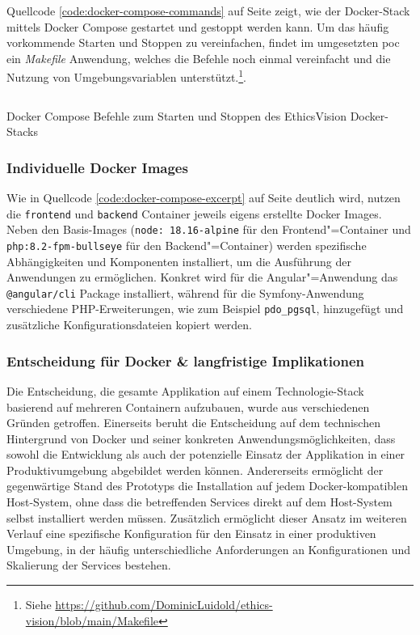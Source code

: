 \documentclass[a4paper,12pt,twoside]{scrreprt}
\begin{document}
\medskip

Quellcode \ref{code:docker-compose-commands} auf Seite \pageref{code:docker-compose-commands} zeigt, wie der Docker-Stack mittels Docker Compose gestartet und gestoppt werden kann. Um das häufig vorkommende Starten und Stoppen zu vereinfachen, findet im umgesetzten \ac{poc} ein \textit{Makefile} Anwendung, welches die Befehle noch einmal vereinfacht und die Nutzung von Umgebungsvariablen unterstützt.\footnote{Siehe \url{https://github.com/DominicLuidold/ethics-vision/blob/main/Makefile}}.

\begin{listing}[ht]
    \inputminted[fontsize=\footnotesize,linenos,xleftmargin=8mm]{bash}{code/Luidold_Docker-Compose-Commands.sh}
    \caption{Docker Compose Befehle zum Starten und Stoppen des EthicsVision Docker-Stacks}
    \label{code:docker-compose-commands}
\end{listing}

\subsubsection*{Individuelle Docker Images}
\label{sub-sub-sec:individuelle-docker-images}

Wie in Quellcode \ref{code:docker-compose-excerpt} auf Seite \pageref{code:docker-compose-excerpt} deutlich wird, nutzen die \texttt{frontend} und \texttt{backend} Container jeweils eigens erstellte Docker Images. Neben den Basis-Images (\texttt{node: 18.16-alpine} für den Frontend"=Container und \texttt{php:8.2-fpm-bullseye} für den Backend"=Container) werden spezifische Abhängigkeiten und Komponenten installiert, um die Ausführung der Anwendungen zu ermöglichen. Konkret wird für die Angular"=Anwendung das \texttt{@angular/cli} Package installiert, während für die Symfony-Anwendung verschiedene PHP-Erweiterungen, wie zum Beispiel \texttt{pdo\_pgsql}, hinzugefügt und zusätzliche Konfigurationsdateien kopiert werden.

\subsubsection*{Entscheidung für Docker \& langfristige Implikationen}
\label{sub-sub-sec:entscheidung-docker}

Die Entscheidung, die gesamte Applikation auf einem Technologie-Stack basierend auf mehreren Containern aufzubauen, wurde aus verschiedenen Gründen getroffen. Einerseits beruht die Entscheidung auf dem technischen Hintergrund von Docker und seiner konkreten Anwendungsmöglichkeiten, dass sowohl die Entwicklung als auch der potenzielle Einsatz der Applikation in einer Produktivumgebung abgebildet werden können. Andererseits ermöglicht der gegenwärtige Stand des Prototyps die Installation auf jedem Docker-kompatiblen Host-System, ohne dass die betreffenden Services direkt auf dem Host-System selbst installiert werden müssen. Zusätzlich ermöglicht dieser Ansatz im weiteren Verlauf eine spezifische Konfiguration für den Einsatz in einer produktiven Umgebung, in der häufig unterschiedliche Anforderungen an Konfigurationen und Skalierung der Services bestehen.
\end{document}
